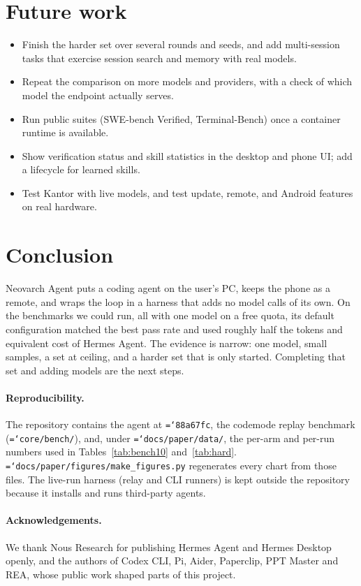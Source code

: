 \documentclass[11pt]{article}
\newcommand{\code}[1]{\texttt{\hyphenchar\font=`\-\relax #1}}
\begin{document}
\section{Future work}
\label{sec:future}
\begin{itemize}
\item Finish the harder set over several rounds and seeds, and add multi-session tasks that exercise session search and memory with real models.
\item Repeat the comparison on more models and providers, with a check of which model the endpoint actually serves.
\item Run public suites (SWE-bench Verified, Terminal-Bench) once a container runtime is available.
\item Show verification status and skill statistics in the desktop and phone UI; add a lifecycle for learned skills.
\item Test Kantor with live models, and test update, remote, and Android features on real hardware.
\end{itemize}

\section{Conclusion}
Neovarch Agent puts a coding agent on the user's PC, keeps the phone as a remote, and wraps the loop in a harness that adds no model calls of its own. On the benchmarks we could run, all
with one model on a free quota, its default configuration matched the best pass rate and used roughly half the tokens and equivalent cost of Hermes Agent. The evidence is narrow: one model,
small samples, a set at ceiling, and a harder set that is only started. Completing that set and adding models are the next steps.

\paragraph{Reproducibility.} The repository contains the agent at \code{88a67fc}, the codemode replay benchmark (\code{core/bench/}), and, under \code{docs/paper/data/}, the per-arm and per-run
numbers used in Tables~\ref{tab:bench10} and~\ref{tab:hard}. \code{docs/paper/figures/make\_figures.py} regenerates every chart from those files. The live-run harness (relay and CLI runners) is kept outside the repository because it installs and runs third-party agents.

\paragraph{Acknowledgements.} We thank Nous Research for publishing Hermes Agent and Hermes Desktop openly, and the authors of Codex CLI, Pi, Aider, Paperclip, PPT Master and REA, whose public work shaped parts of this project.



\end{document}
